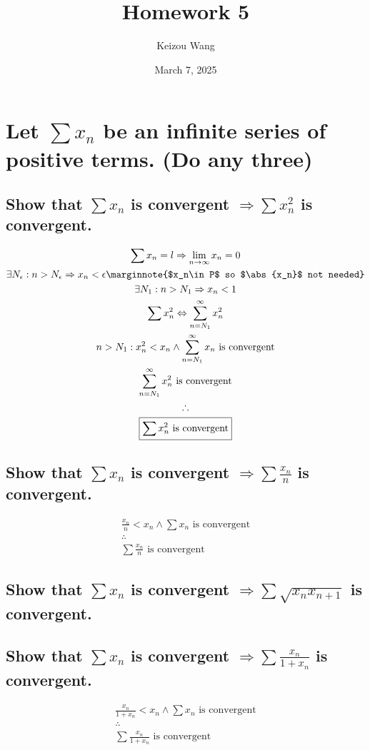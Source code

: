 \documentclass[letterpaper]{article}
\title{Homework 5}
\author{Keizou Wang}
\date{March 7, 2025}
\DeclarePairedDelimiter{\abs}{\lvert}{\rvert}
\begin{document}
\maketitle

\section{Let $\sum x_n$ be an infinite series of positive terms. (\textbf{Do any three})}
\subsection{Show that $\sum x_n$ is convergent $\Rightarrow\sum x_n^2$ is convergent.}
\begin{gather*}
\sum x_n=l\Rightarrow \lim_{n\rightarrow\infty}x_n=0 \\
\exists N_\epsilon:n>N_\epsilon\Rightarrow x_n<\epsilon \marginnote{$x_n\in P$ so $\abs{x_n}$ not needed} \\
\exists N_1:n>N_1\Rightarrow x_n<1 \\
\sum x_n^2\Leftrightarrow\sum_{n=N_1}^{\infty}x_n^2 \\
n>N_1:x_n^2<x_n\land\sum_{n=N_1}^{\infty}x_n\text{ is convergent} \\
\sum_{n=N_1}^{\infty}x_n^2\text{ is convergent} \\
\therefore \\
\boxed{\sum x_n^2\text{ is convergent}}
\end{gather*}
\subsection{Show that $\sum x_n$ is convergent $\Rightarrow\sum \frac{x_n}{n}$ is convergent.}
\begin{gather*}
\frac{x_n}{n}<x_n \land \sum x_n \text{ is convergent} \\
\therefore \\
\boxed{\sum\frac{x_n}{n}\text{ is convergent}}
\end{gather*}
\subsection{Show that $\sum x_n$ is convergent $\Rightarrow\sum \sqrt{x_nx_{n+1}}$ is convergent.}
\begin{center}\end{center}
\subsection{Show that $\sum x_n$ is convergent $\Rightarrow\sum \frac{x_n}{1+x_n}$ is convergent.}
\begin{gather*}
\frac{x_n}{1+x_n}<x_n \land \sum x_n \text{ is convergent} \\
\therefore \\
\boxed{\sum\frac{x_n}{1+x_n}\text{ is convergent}}
\end{gather*}
\end{document}
